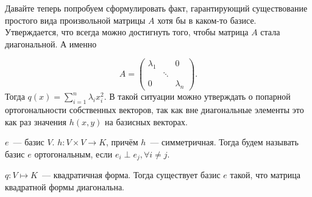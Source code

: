 Давайте теперь попробуем сформулировать факт, гарантирующий существование простого вида
произвольной матрицы $A$ хотя бы в каком-то базисе. Утверждается, что всегда можно
достигнуть того, чтобы матрица $A$ стала диагональной. А именно

\[
     A = 
     \begin{pmatrix}
         \lambda_ 1 & & 0 \\
        & \ddots & \\
        0& & \lambda_n
     \end{pmatrix}
.\] 
Тогда $q(x) = \sum\limits_{i=1}^{n}{\lambda_i x_i^2}$.
В такой ситуации можно утверждать о попарной ортогональности собственных векторов,
так как вне диагональные элементы это как раз значения $h(x,y)$ на базисных векторах.

\begin{definition}
    $e$~--- базис $V$. $h\colon V\times V\rightarrow K$, причём $h$~--- симметричная.
    Тогда будем называть базис  $e$ ортогональным, если $e_i\perp e_j, \forall i\not=j$.
\end{definition}
\begin{theorem}
    $q\colon V \mapsto K$~--- квадратичная форма. Тогда существует базис $e$ такой, что
    матрица квадратной формы диагональна.
\end{theorem}
